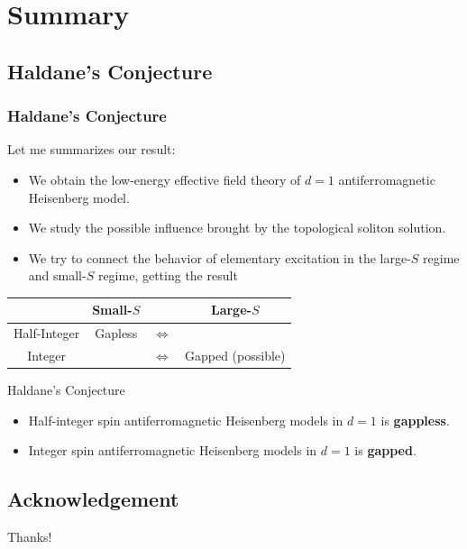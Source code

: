 \documentclass[10pt,aspectratio=43,xcolor=x11names,t]{beamer}%
\begin{document}
\section{Summary}
	\subsection{Haldane's Conjecture}
		\begin{frame}\frametitle{Haldane's Conjecture}
			Let me summarizes our result:
			\begin{itemize}
				\item We obtain the low-energy effective field theory of $d=1$ antiferromagnetic Heisenberg model.
				\item We study the possible influence brought by the topological soliton solution.
				\item We try to connect the behavior of elementary excitation in the large-$S$ regime and small-$S$ regime, getting the result
			\end{itemize}
			\begin{center}
				\begin{tabular}{c|c|c|c}
					\hline
					& Small-$S$  & & Large-$S$\\
					\hline
					Half-Integer & Gapless & $\Longleftrightarrow$ & \\
					\hline
					Integer & & $\Longleftrightarrow$ & Gapped (possible)\\
					\hline
				\end{tabular}
			\end{center}
			\pause
			\begin{redblock}{Haldane's Conjecture}
				\begin{itemize}
					\item Half-integer spin antiferromagnetic Heisenberg models in $d=1$ is \textbf{gappless}.
					\item Integer spin antiferromagnetic Heisenberg models in $d=1$ is \textbf{gapped}.
				\end{itemize}
			\end{redblock}
		\end{frame}

	\subsection{Acknowledgement}
		\begin{frame}[c] %
			\begin{center}
				{\fontsize{50}{60}\selectfont Thanks!}
			\end{center}
		\end{frame}
\end{document}
